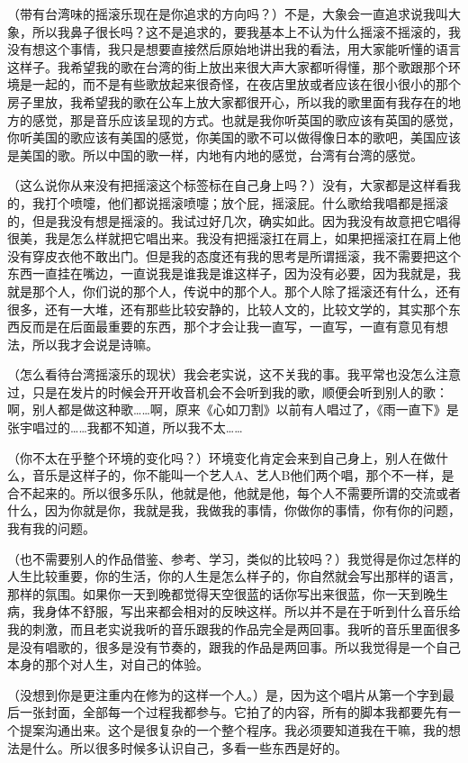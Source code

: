 \documentclass[UTF8,a4paper,oneside,twocolumn,12pt]{ctexbook}
\begin{document}
（带有台湾味的摇滚乐现在是你追求的方向吗？）不是，大象会一直追求说我叫大象，所以我鼻子很长吗？这不是追求的，要我基本上不认为什么摇滚不摇滚的，我没有想这个事情，我只是想要直接然后原始地讲出我的看法，用大家能听懂的语言这样子。我希望我的歌在台湾的街上放出来很大声大家都听得懂，那个歌跟那个环境是一起的，而不是有些歌放起来很奇怪，在夜店里放或者应该在很小很小的那个房子里放，我希望我的歌在公车上放大家都很开心，所以我的歌里面有我存在的地方的感觉，那是音乐应该呈现的方式。也就是我你听英国的歌应该有英国的感觉，你听美国的歌应该有美国的感觉，你美国的歌不可以做得像日本的歌吧，美国应该是美国的歌。所以中国的歌一样，内地有内地的感觉，台湾有台湾的感觉。

（这么说你从来没有把摇滚这个标签标在自己身上吗？）没有，大家都是这样看我的，我打个喷嚏，他们都说摇滚喷嚏；放个屁，摇滚屁。什么歌给我唱都是摇滚的，但是我没有想是摇滚的。我试过好几次，确实如此。因为我没有故意把它唱得很美，我是怎么样就把它唱出来。我没有把摇滚扛在肩上，如果把摇滚扛在肩上他没有穿皮衣他不敢出门。但是我的态度还有我的思考是所谓摇滚，我不需要把这个东西一直挂在嘴边，一直说我是谁我是谁这样子，因为没有必要，因为我就是，我就是那个人，你们说的那个人，传说中的那个人。那个人除了摇滚还有什么，还有很多，还有一大堆，还有那些比较安静的，比较人文的，比较文学的，其实那个东西反而是在后面最重要的东西，那个才会让我一直写，一直写，一直有意见有想法，所以我才会说是诗嘛。

（怎么看待台湾摇滚乐的现状）我会老实说，这不关我的事。我平常也没怎么注意过，只是在发片的时候会开开收音机会不会听到我的歌，顺便会听到别人的歌：啊，别人都是做这种歌……啊，原来《心如刀割》以前有人唱过了，《雨一直下》是张宇唱过的……我都不知道，所以我不太……

（你不太在乎整个环境的变化吗？）环境变化肯定会来到自己身上，别人在做什么，音乐是这样子的，你不能叫一个艺人A、艺人B他们两个唱，那个不一样，是合不起来的。所以很多乐队，他就是他，他就是他，每个人不需要所谓的交流或者什么，因为你就是你，我就是我，我做我的事情，你做你的事情，你有你的问题，我有我的问题。

（也不需要别人的作品借鉴、参考、学习，类似的比较吗？）我觉得是你过怎样的人生比较重要，你的生活，你的人生是怎么样子的，你自然就会写出那样的语言，那样的氛围。如果你一天到晚都觉得天空很蓝的话你写出来很蓝，你一天到晚生病，我身体不舒服，写出来都会相对的反映这样。所以并不是在于听到什么音乐给我的刺激，而且老实说我听的音乐跟我的作品完全是两回事。我听的音乐里面很多是没有唱歌的，很多是没有节奏的，跟我的作品是两回事。所以我觉得是一个自己本身的那个对人生，对自己的体验。

（没想到你是更注重内在修为的这样一个人。）是，因为这个唱片从第一个字到最后一张封面，全部每一个过程我都参与。它拍了的内容，所有的脚本我都要先有一个提案沟通出来。这个是很复杂的一个整个程序。我必须要知道我在干嘛，我的想法是什么。所以很多时候多认识自己，多看一些东西是好的。
\end{document}
